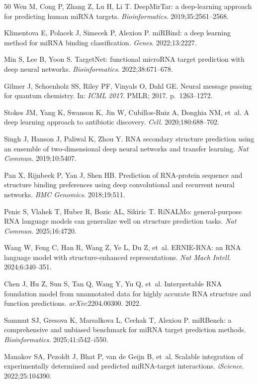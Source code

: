\documentclass[sn-mathphys-num]{sn-jnl}
\begin{document}
\begin{thebibliography}{50}
Wen M, Cong P, Zhang Z, Lu H, Li T. DeepMirTar: a deep-learning approach for predicting human miRNA targets. \textit{Bioinformatics}. 2019;35:2561--2568.

Klimentova E, Polacek J, Simecek P, Alexiou P. miRBind: a deep learning method for miRNA binding classification. \textit{Genes}. 2022;13:2227.

Min S, Lee B, Yoon S. TargetNet: functional microRNA target prediction with deep neural networks. \textit{Bioinformatics}. 2022;38:671--678.

Gilmer J, Schoenholz SS, Riley PF, Vinyals O, Dahl GE. Neural message passing for quantum chemistry. In: \textit{ICML 2017}. PMLR; 2017. p.~1263--1272.

Stokes JM, Yang K, Swanson K, Jin W, Cubillos-Ruiz A, Donghia NM, et~al. A deep learning approach to antibiotic discovery. \textit{Cell}. 2020;180:688--702.

Singh J, Hanson J, Paliwal K, Zhou Y. RNA secondary structure prediction using an ensemble of two-dimensional deep neural networks and transfer learning. \textit{Nat Commun}. 2019;10:5407.

Pan X, Rijnbeek P, Yan J, Shen HB. Prediction of RNA-protein sequence and structure binding preferences using deep convolutional and recurrent neural networks. \textit{BMC Genomics}. 2018;19:511.

Penic S, Vlahek T, Huber R, Bozic AL, Sikiric T. RiNALMo: general-purpose RNA language models can generalize well on structure prediction tasks. \textit{Nat Commun}. 2025;16:4720.

Wang W, Feng C, Han R, Wang Z, Ye L, Du Z, et~al. ERNIE-RNA: an RNA language model with structure-enhanced representations. \textit{Nat Mach Intell}. 2024;6:340--351.

Chen J, Hu Z, Sun S, Tan Q, Wang Y, Yu Q, et~al. Interpretable RNA foundation model from unannotated data for highly accurate RNA structure and function predictions. \textit{arXiv}:2204.00300. 2022.

Sammut SJ, Gresova K, Marsalkova L, Cechak T, Alexiou P. miRBench: a comprehensive and unbiased benchmark for miRNA target prediction methods. \textit{Bioinformatics}. 2025;41:i542--i550.

Manakov SA, Pezoldt J, Bhat P, van de Geijn B, et~al. Scalable integration of experimentally determined and predicted miRNA-target interactions. \textit{iScience}. 2022;25:104390.


\end{thebibliography}
\end{document}
